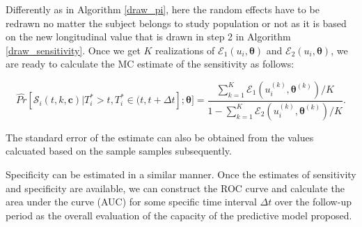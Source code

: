 Differently as in Algorithm \ref{draw_pi}, here the random effects have to be redrawn no matter the subject belongs to study population or not as it is based on the new longitudinal value that is drawn in step 2 in Algorithm \ref{draw_sensitivity}. Once we get $K$ realizations of $\mathcal{E}_1(u_i, \boldsymbol{\theta})$ and $\mathcal{E}_2(u_i, \boldsymbol{\theta})$, we are ready to calculate the MC estimate of the sensitivity as follows:

\begin{equation}\label{eqn:est_sensitivity}
\widehat{Pr}[\mathcal{S}_i(t,k,\boldsymbol{c})|T_i^*>t, T_i^*\in (t, t+\Delta t];\boldsymbol{\theta}] =\frac{\sum_{k=1}^K\mathcal{E}_1(u_i^{(k)}, \boldsymbol{\theta}^{(k)})/K}{1-\sum_{k=1}^K\mathcal{E}_2(u_i^{(k)}, \boldsymbol{\theta}^{(k)})/K}.
\end{equation}

The standard error of the estimate can also be obtained from the values calcuated based on the sample samples subsequently.





Specificity can be estimated in a similar manner. Once the estimates of sensitivity and specificity are available, we can construct the ROC curve and calculate the area under the curve (AUC) for some specific time interval $\Delta t$ over the follow-up period as the overall evaluation of the capacity of the predictive model proposed.






%
%
% 


% 